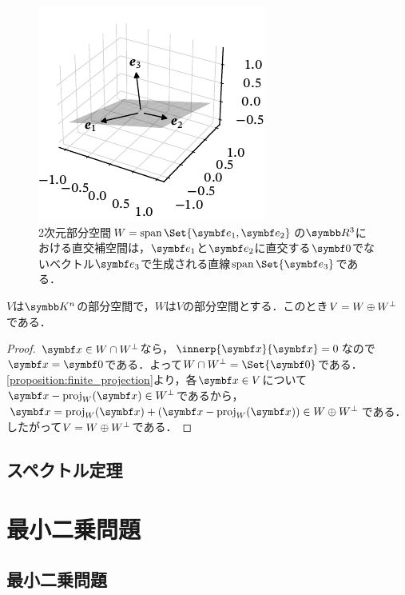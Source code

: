 \documentclass[../../main]{subfiles}
\begin{document}
\begin{figure}[htbp]
  \centering
  \includegraphics{orthogonal_complement.pdf}
  \caption{2次元部分空間\(W=\spannedby\Set{\vect{e}_1,\vect{e}_2}\)の\(\numset{R}^3\)における直交補空間は，\(\vect{e}_1\)と\(\vect{e}_2\)に直交する\(\zvec\)でないベクトル\(\vect{e}_3\)で生成される直線\(\spannedby\Set{\vect{e}_3}\)である．}
\end{figure}

\begin{proposition}{}{}
  \(V\)は\(\numset{K}^n\)の部分空間で，\(W\)は\(V\)の部分空間とする．このとき\(V=W\oplus W^{\mathord{\perp}}\)である．
\end{proposition}

\begin{proof}
  \(\vect{x}\in W\cap\pcomp{W}\)なら，\(\innerp{\vect{x}}{\vect{x}}=0\)なので\(\vect{x}=\zvec\)である．よって\(W\cap\pcomp{W}=\Set{\zvec}\)である．
  \cref{proposition:finite_projection}より，各\(\vect{x}\in V\)について\(\vect{x}-\proj_W(\vect{x})\in\pcomp{W}\)であるから，
  \(\vect{x}=\proj_W(\vect{x})+(\vect{x}-\proj_W(\vect{x}))\in W\oplus\pcomp{W}\)である．したがって\(V=W\oplus W^{\mathord{\perp}}\)である．
\end{proof}

\subsection{スペクトル定理}

\section{最小二乗問題}

\subsection{最小二乗問題}
\end{document}
